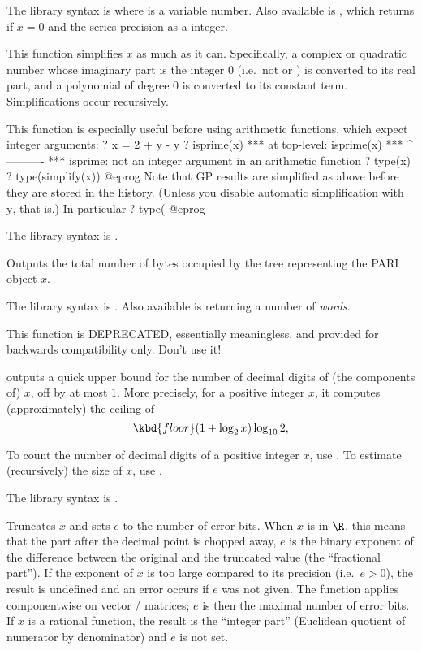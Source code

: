The library syntax is  where  is a variable number.
Also available is , which returns
 if $x = 0$ and the series precision as a  integer.

\label{se:simplify}
This function simplifies $x$ as much as it can. Specifically, a complex or
quadratic number whose imaginary part is the integer 0 (i.e.~not 
or ) is converted to its real part, and a polynomial of degree $0$
is converted to its constant term. Simplifications occur recursively.

This function is especially useful before using arithmetic functions,
which expect integer arguments:
\bprog
? x = 2 + y - y
? isprime(x)
  ***   at top-level: isprime(x)
  ***                 ^----------
  *** isprime: not an integer argument in an arithmetic function
? type(x)
? type(simplify(x))
@eprog
Note that GP results are simplified as above before they are stored in the
history. (Unless you disable automatic simplification with \b{y}, that is.)
In particular
\bprog
? type(%
@eprog

The library syntax is .

\label{se:sizebyte}
Outputs the total number of bytes occupied by the tree representing the
PARI object $x$.

The library syntax is .
Also available is  returning a
number of \emph{words}.

\label{se:sizedigit}
This function is DEPRECATED, essentially meaningless, and provided for
backwards compatibility only. Don't use it!

outputs a quick upper bound for the number of decimal digits of (the
components of) $x$, off by at most $1$. More precisely, for a positive
integer $x$, it computes (approximately) the ceiling of
$$\kbd{floor}(1 + \log_2 x) \log_{10}2,$$

To count the number of decimal digits of a positive integer $x$, use
. To estimate (recursively) the size of $x$, use
.

The library syntax is .

\label{se:truncate}
Truncates $x$ and sets $e$ to the number of
error bits. When $x$ is in $\R$, this means that the part after the decimal
point is chopped away, $e$ is the binary exponent of the difference between
the original and the truncated value (the ``fractional part''). If the
exponent of $x$ is too large compared to its precision (i.e.~$e>0$), the
result is undefined and an error occurs if $e$ was not given. The function
applies componentwise on vector / matrices; $e$ is then the maximal number of
error bits. If $x$ is a rational function, the result is the ``integer part''
(Euclidean quotient of numerator by denominator) and $e$ is not set.

